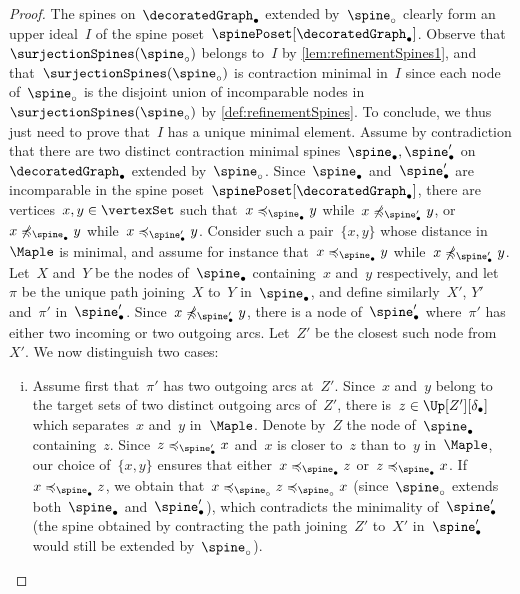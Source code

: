 \documentclass{amsart}
\theoremstyle{definition}
\newcommand{\decoration}{\delta}
\begin{document}
\begin{proof}
  The spines on~$\decoratedGraph_\bullet$ extended by~$\spine_\circ$ clearly form an upper ideal~$I$ of the spine poset~$\spinePoset[\decoratedGraph_\bullet]$.
  Observe that~$\surjectionSpines(\spine_\circ)$ belongs to~$I$ by \cref{lem:refinementSpines1}, and that~$\surjectionSpines(\spine_\circ)$ is contraction minimal in~$I$ since each node of~$\spine_\circ$ is the disjoint union of incomparable nodes in~$\surjectionSpines(\spine_\circ)$ by \cref{def:refinementSpines}.
  To conclude, we thus just need to prove that~$I$ has a unique minimal element.
  Assume by contradiction that there are two distinct contraction minimal spines~$\spine_\bullet, \spine_\bullet'$ on~$\decoratedGraph_\bullet$ extended by~$\spine_\circ$.
  Since~$\spine_\bullet$ and~$\spine_\bullet'$ are incomparable in the spine poset~$\spinePoset[\decoratedGraph_\bullet]$, there are vertices~$x,y \in \vertexSet$ such that~$x \preccurlyeq_{\spine_\bullet} y$ while~$x \not\preccurlyeq_{\spine_\bullet'} y$, or~$x \not\preccurlyeq_{\spine_\bullet} y$ while~$x \preccurlyeq_{\spine_\bullet'} y$.
  Consider such a pair~$\{x,y\}$ whose distance in~$\Maple$ is minimal, and assume for instance that~$x \preccurlyeq_{\spine_\bullet} y$ while~$x \not\preccurlyeq_{\spine_\bullet'} y$.
  Let~$X$ and~$Y$ be the nodes of~$\spine_\bullet$ containing~$x$ and~$y$ respectively, and let~$\pi$ be the unique path joining~$X$ to~$Y$ in~$\spine_\bullet$, and define similarly~$X'$, $Y'$ and~$\pi'$ in~$\spine_\bullet'$.
  Since~$x \not\preccurlyeq_{\spine_\bullet'} y$, there is a node of~$\spine_\bullet'$ where~$\pi'$ has either two incoming or two outgoing arcs.
  Let~$Z'$ be the closest such node from~$X'$.
  We now distinguish two cases:
  \begin{enumerate}[(i)]
    \item Assume first that~$\pi'$ has two outgoing arcs at~$Z'$.
    Since~$x$ and~$y$ belong to the target sets of two distinct outgoing arcs of~$Z'$, there is~$z \in \Up[Z'][\decoration_\bullet]$ which separates~$x$ and~$y$ in~$\Maple$.
    Denote by~$Z$ the node of~$\spine_\bullet$ containing~$z$.
    Since~$z \preccurlyeq_{\spine_\bullet'} x$ and~$x$ is closer to~$z$ than to~$y$ in~$\Maple$, our choice of~$\{x,y\}$ ensures that either~$x \preccurlyeq_{\spine_\bullet} z$ or~$z \preccurlyeq_{\spine_\bullet} x$.
    If~$x \preccurlyeq_{\spine_\bullet} z$, we obtain that~$x \preccurlyeq_{\spine_\circ} z \preccurlyeq_{\spine_\circ} x$ (since~$\spine_\circ$ extends both~$\spine_\bullet$ and~$\spine_\bullet'$), which contradicts the minimality of~$\spine_\bullet'$ (the spine obtained by contracting the path joining~$Z'$ to~$X'$ in~$\spine_\bullet'$ would still be extended by~$\spine_\circ$).

\end{enumerate}
\end{proof}
\end{document}
